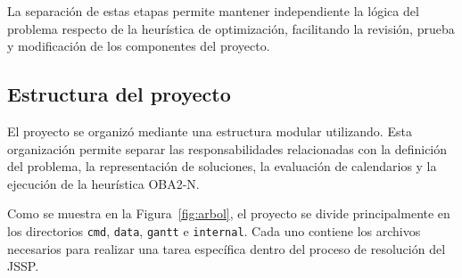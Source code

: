 \documentclass[12pt,a4paper]{article}
\begin{document}
La separación de estas etapas permite mantener independiente la lógica del problema respecto de la heurística de optimización, facilitando la revisión, prueba y modificación de los componentes del proyecto.

\subsection{Estructura del proyecto}
\label{sec:estructura}

El proyecto se organizó mediante una estructura modular utilizando. Esta organización permite separar las responsabilidades relacionadas con la definición del problema, la representación de soluciones, la evaluación de calendarios y la ejecución de la heurística OBA2-N.

Como se muestra en la Figura~\ref{fig:arbol}, el proyecto se divide principalmente en los directorios \texttt{cmd}, \texttt{data}, \texttt{gantt} e \texttt{internal}. Cada uno contiene los archivos necesarios para realizar una tarea específica dentro del proceso de resolución del JSSP.
\end{document}
